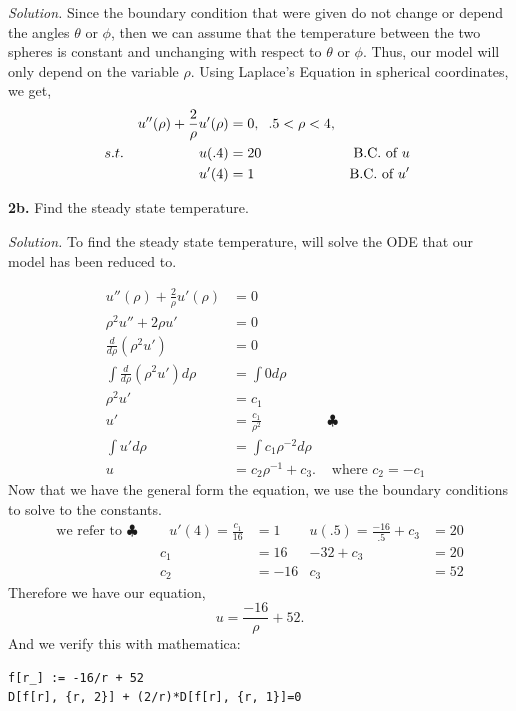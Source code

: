 \documentclass{article}
\begin{document}
\vspace{3mm}
\textit{Solution.} Since the boundary condition that were given do not change or depend the angles \(\theta \) or \( \phi\), then we can assume that the temperature between the two spheres is constant and unchanging with respect to \(\theta \) or \(\phi\). Thus, our model will only depend on the variable \(\rho\). Using Laplace's Equation in spherical coordinates, we get, 
\begin{align*}
&& u''(\rho) + \frac{2}{\rho} u'(\rho) &= 0,  \hspace{2mm} .5<\rho<4,  &     & \\
s.t. &&  u(.4) &= 20    &  \text{ B.C. of \(u\) }& \\
&&  u'(4) &= 1  &  \text{B.C. of \(u'\) }&
\end{align*}

\vspace{3mm}
\textbf{2b.} Find the steady state temperature. 

\vspace{3mm}
\textit{Solution.}  To find the steady state temperature, will solve the ODE that our model has  been reduced to.

\begin{align*}
 &&     u''(\rho) + \frac{2}{\rho} u'(\rho) &= 0     &     &   \\
 &    &   \rho^2u'' + 2\rho u'  &=0      &     \text{  }&   \\
 &&   \frac{d}{d\rho}(\rho^2u') &=0      &      \text{}&   \\
 &&    \int \frac{d}{d\rho}(\rho^2u') d\rho &= \int 0 d\rho     &      \text{  }&   \\
 &&    \rho^2 u'  &=   c_1   &      \text{  }&   \\
 &&   u' &=  \frac{c_1}{\rho^2}  &  \clubsuit & \\
 &&    \int u' d \rho  &=  \int c_1 \rho^{-2} d\rho   &     \text{  } &   \\
 &&     u &= c_2 \rho^{-1} + c_3.     &     \text{ where }c_2=-c_1&  
\end{align*}
Now that we have the general form the equation, we use the boundary conditions to solve to the constants. 
\begin{align*}
\text{we refer to } \clubsuit && \text{   } u'(4)= \frac{c_1}{16}&=1     & u(.5) = \frac{-16}{.5} + c_3 &=20      \\
&&  c_1 &= 16 &            -32+c_3 &=  20  \\
&&  c_2 &= -16  &   c_3 &= 52
\end{align*}
Therefore we have our equation,
\[  u = \frac{-16}{\rho} + 52.   
\]
And we verify this with mathematica:
\begin{verbatim}
f[r_] := -16/r + 52 
D[f[r], {r, 2}] + (2/r)*D[f[r], {r, 1}]=0
\end{verbatim}
\end{document}
